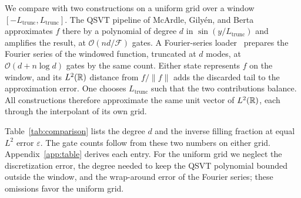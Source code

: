 We compare with two constructions on a uniform grid over a window
$[-L_{\mathrm{trunc}},L_{\mathrm{trunc}}]$.  The QSVT pipeline of
McArdle, Gily\'en, and Berta~\cite{McArdleGilyenBerta2025}
approximates $f$ there by a polynomial of degree $d$ in
$\sin(y/L_{\mathrm{trunc}})$ and amplifies the result, at
$\mathcal{O}(nd/\mathcal{F})$ gates.  A Fourier-series
loader~\cite{MoosaEtAl2023} prepares the Fourier series of the
windowed function, truncated at $d$ modes, at
$\mathcal{O}(d+n\log d)$ gates by the same count.  Either state represents $f$ on the
window, and its $L^2(\mathbb{R})$ distance from $f/\|f\|$ adds the
discarded tail to the approximation error.  One chooses
$L_{\mathrm{trunc}}$ such that the two contributions balance.  All constructions
therefore approximate the same unit vector of $L^2(\mathbb{R})$, each
through the interpolant of its own grid.

Table~\ref{tab:comparison} lists the degree $d$ and the inverse
filling fraction at equal $L^2$ error $\varepsilon$.  The gate
counts follow from these two numbers on either grid.
Appendix~\ref{app:table} derives each entry.  For the uniform grid
we neglect the discretization error, the degree needed to keep the
QSVT polynomial bounded outside the window, and the wrap-around
error of the Fourier series; these omissions favor the uniform
grid.

